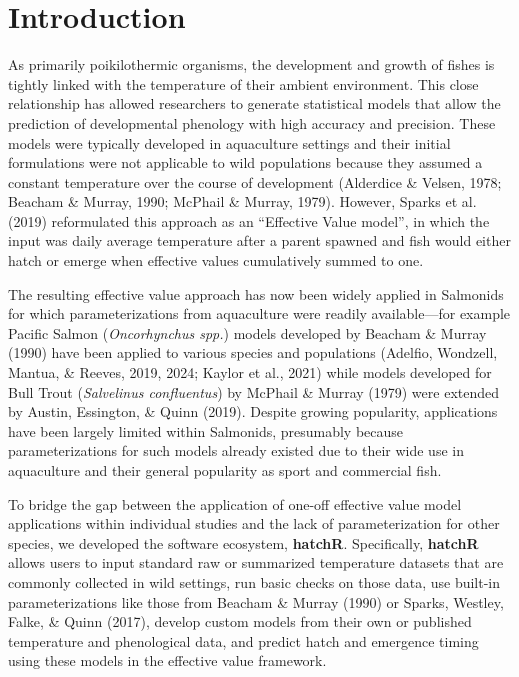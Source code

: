 \documentclass[10pt,a4paper,onecolumn]{article}
\begin{document}
\section{Introduction}\label{introduction}

As primarily poikilothermic organisms, the development and growth of
fishes is tightly linked with the temperature of their ambient
environment. This close relationship has allowed researchers to generate
statistical models that allow the prediction of developmental phenology
with high accuracy and precision. These models were typically developed
in aquaculture settings and their initial formulations were not
applicable to wild populations because they assumed a constant
temperature over the course of development (Alderdice \& Velsen, 1978;
Beacham \& Murray, 1990; McPhail \& Murray, 1979). However, Sparks et
al. (2019) reformulated this approach as an ``Effective Value model'',
in which the input was daily average temperature after a parent spawned
and fish would either hatch or emerge when effective values cumulatively
summed to one.

The resulting effective value approach has now been widely applied in
Salmonids for which parameterizations from aquaculture were readily
available---for example Pacific Salmon (\emph{Oncorhynchus spp.}) models
developed by Beacham \& Murray (1990) have been applied to various
species and populations (Adelfio, Wondzell, Mantua, \& Reeves, 2019,
2024; Kaylor et al., 2021) while models developed for Bull Trout
(\emph{Salvelinus confluentus}) by McPhail \& Murray (1979) were
extended by Austin, Essington, \& Quinn (2019). Despite growing
popularity, applications have been largely limited within Salmonids,
presumably because parameterizations for such models already existed due
to their wide use in aquaculture and their general popularity as sport
and commercial fish.

To bridge the gap between the application of one-off effective value
model applications within individual studies and the lack of
parameterization for other species, we developed the software ecosystem,
\textbf{hatchR}. Specifically, \textbf{hatchR} allows users to input
standard raw or summarized temperature datasets that are commonly
collected in wild settings, run basic checks on those data, use built-in
parameterizations like those from Beacham \& Murray (1990) or Sparks,
Westley, Falke, \& Quinn (2017), develop custom models from their own or
published temperature and phenological data, and predict hatch and
emergence timing using these models in the effective value framework.
\end{document}
